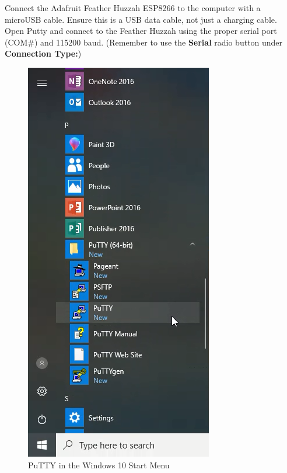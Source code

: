 \documentclass{book}
\makeatletter
\def\maxwidth{\ifdim\Gin@nat@width>\linewidth\linewidth
    \else\Gin@nat@width\fi}
\let\Oldincludegraphics\includegraphics
\renewcommand{\includegraphics}[1]{\Oldincludegraphics[width=.8\maxwidth]{#1}}
\makeatother
\begin{document}
    
        Connect the Adafruit Feather Huzzah ESP8266 to the computer with a
microUSB cable. Ensure this is a USB data cable, not just a charging
cable. Open Putty and connect to the Feather Huzzah using the proper
serial port (COM\#) and 115200 baud. (Remember to use the
\textbf{Serial} radio button under \textbf{Connection Type:})

\begin{figure}
\centering
\includegraphics{images/putty_in_start_menu.png}
\caption{PuTTY in the Windows 10 Start Menu}
\end{figure}
\end{document}
